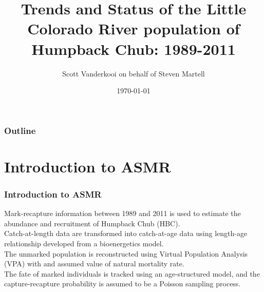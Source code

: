 \documentclass{beamer}
\title[Short title of the talk]{Trends and Status of the Little Colorado River population of Humpback Chub: 1989-2011}
\author{Scott Vanderkooi on behalf of Steven Martell}
\institute[UBC]
{
University of British Columbia \\
\medskip
{\emph{s.martell@mail.ubc.ca}}
}
\date{\today}
\begin{document}
%
\begin{frame}
\titlepage
\end{frame}
%
\begin{frame}[t]\frametitle{Outline}
	\tableofcontents
\end{frame}
%
\section[Introduction]{Introduction to ASMR} %
\label{sec:introduction}
\begin{frame}[t]\frametitle{Introduction to ASMR}
	Mark-recapture information between 1989 and 2011 is used to estimate the abundance and recruitment of Humpback Chub (HBC).\\
	\medskip
	Catch-at-length data are transformed into catch-at-age data using length-age relationship developed from a bioenergetics model.\\
	\medskip
	The unmarked population is reconstructed using Virtual Population Analysis (VPA) with and assumed value of natural mortality rate.\\
	\medskip
	The fate of marked individuals is tracked using an age-structured model, and the capture-recapture probability is assumed to be a Poisson sampling process.\\
\end{frame}
%
\end{document}
